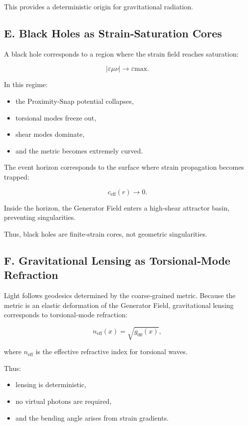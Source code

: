 \documentclass[reprint,amsmath,amssymb,aps,prl,floatfix]{revtex4-2}
\begin{document}
\begin{itemize}
This provides a deterministic origin for gravitational radiation.

\subsection{E. Black Holes as Strain‑Saturation Cores}

A black hole corresponds to a region where the strain field reaches saturation:

\[
|\varepsilon{\mu\nu}| \rightarrow \varepsilon{\mathrm{max}}.
\]

In this regime:

\begin{itemize}
\item the Proximity‑Snap potential collapses,  
\item torsional modes freeze out,  
\item shear modes dominate,  
\item and the metric becomes extremely curved.
\end{itemize}

The event horizon corresponds to the surface where strain propagation becomes trapped:

\[
c_{\mathrm{eff}}(r) \rightarrow 0.
\]

Inside the horizon, the Generator Field enters a high‑shear attractor basin, preventing singularities.
\medskip

Thus, black holes are finite‑strain cores, not geometric singularities.

\subsection{F. Gravitational Lensing as Torsional‑Mode Refraction}

Light follows geodesics determined by the coarse‑grained metric.  
Because the metric is an elastic deformation of the Generator Field, gravitational lensing corresponds to torsional‑mode refraction:

\[
n_{\mathrm{eff}}(x)
=
\sqrt{g_{00}(x)},
\]

where \(n_{\mathrm{eff}}\) is the effective refractive index for torsional waves.

Thus:
\begin{itemize}
\item lensing is deterministic,  
\item no virtual photons are required,  
\item and the bending angle arises from strain gradients.
\end{itemize}


\end{itemize}
\end{document}
